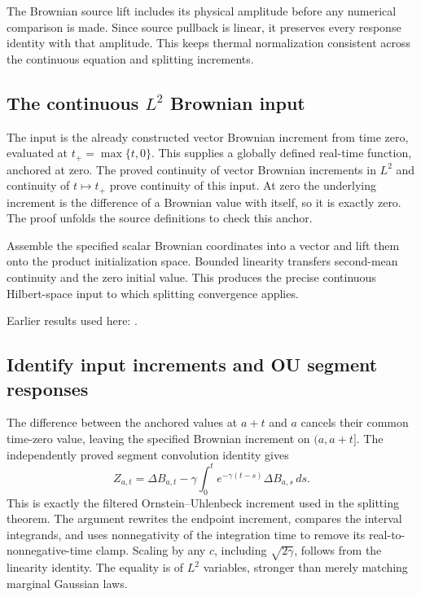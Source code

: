\documentclass[11pt,a4paper]{report}
\begin{document}
The Brownian source lift includes its physical amplitude before any numerical comparison is made. Since source pullback is linear, it preserves every response identity with that amplitude. This keeps thermal normalization consistent across the continuous equation and splitting increments.

\subsection{\texorpdfstring{The continuous \(L^{2}\) Brownian input}{The continuous L² Brownian input}}
\label{report-step-KineticLangevin-CanonicalSplitting-lean-2}


The input is the already constructed vector Brownian increment from time zero, evaluated at \(t_+=\max\{t,0\}\). This supplies a globally defined real-time function, anchored at zero. The proved continuity of vector Brownian increments in \(L^{2}\) and continuity of \(t\mapsto t_+\) prove continuity of this input. At zero the underlying increment is the difference of a Brownian value with itself, so it is exactly zero. The proof unfolds the source definitions to check this anchor.



Assemble the specified scalar Brownian coordinates into a vector and lift them onto the product initialization space. Bounded linearity transfers second-mean continuity and the zero initial value. This produces the precise continuous Hilbert-space input to which splitting convergence applies.



Earlier results used here: \cite[Section~3.8.17]{LangevinLean2026ULASC}.
\subsection{\texorpdfstring{Identify input increments and OU segment responses}{Identify input increments and OU segment responses}}
\label{report-step-KineticLangevin-CanonicalSplitting-lean-3}


The difference between the anchored values at \(a+t\) and \(a\) cancels their common time-zero value, leaving the specified Brownian increment on \((a,a+t]\). The independently proved segment convolution identity gives \[Z_{a,t}=\Delta B_{a,t}-\gamma\int_0^t e^{-\gamma(t-s)}\Delta B_{a,s}\,ds.\] This is exactly the filtered Ornstein–Uhlenbeck increment used in the splitting theorem. The argument rewrites the endpoint increment, compares the interval integrands, and uses nonnegativity of the integration time to remove its real-to-nonnegative-time clamp. Scaling by any \(c\), including \(\sqrt{2\gamma}\), follows from the linearity identity. The equality is of \(L^{2}\) variables, stronger than merely matching marginal Gaussian laws.
\end{document}
